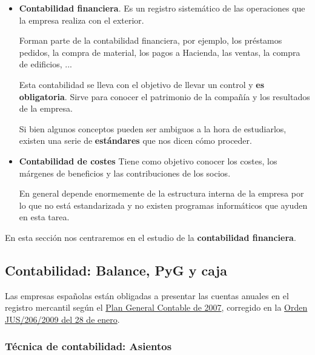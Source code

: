 \documentclass[nochap,palatino,shortheader]{apuntes}
\newcommand{\study}[1]{#1} \newcommand{\substudy}[1]{#1}
\begin{document}
\begin{itemize}
\item \textbf{Contabilidad \study{financiera}}. Es un \substudy{registro} sistemático \substudy{de} las \substudy{operaciones} que la empresa realiza con el \substudy{exterior}.

Forman parte de la contabilidad financiera, por ejemplo, los préstamos pedidos, la compra de material, los pagos a Hacienda, las ventas, la compra de edificios, ...

Esta contabilidad se lleva con el objetivo de llevar un control y \textbf{es \study{obligatoria}}. Sirve para \substudy{conocer el patrimonio de la compañía y los resultados de la empresa}.

Si bien algunos conceptos pueden ser ambiguos a la hora de estudiarlos, \substudy{existen} una serie de \textbf{\substudy{estándares}} que nos dicen cómo proceder.

\item \textbf{Contabilidad de costes} Tiene como objetivo conocer los costes, los \substudy{márgenes de beneficios} y las contribuciones de los socios.

En general \substudy{depende} enormemente de la \substudy{estructura interna} de la empresa por lo que no está estandarizada y no existen programas informáticos que ayuden en esta tarea.
\end{itemize}

En esta sección nos centraremos en el estudio de la \textbf{contabilidad financiera}.

\subsection{Contabilidad: Balance, PyG y caja}
\label{sec:Contabilidad}

Las \substudy{empresas españolas} están \substudy{obligadas a presentar las cuentas anuales} en el registro mercantil según el \href{https://www.boe.es/buscar/doc.php?id=BOE-A-2007-13023}{\substudy{Plan General Contable} de 2007}, corregido en la \href{https://www.boe.es/boe/dias/2009/02/10/pdfs/BOE-A-2009-2276.pdf}{Orden JUS/206/2009 del 28 de enero}.

\subsubsection{Técnica de contabilidad: Asientos}
\end{document}
